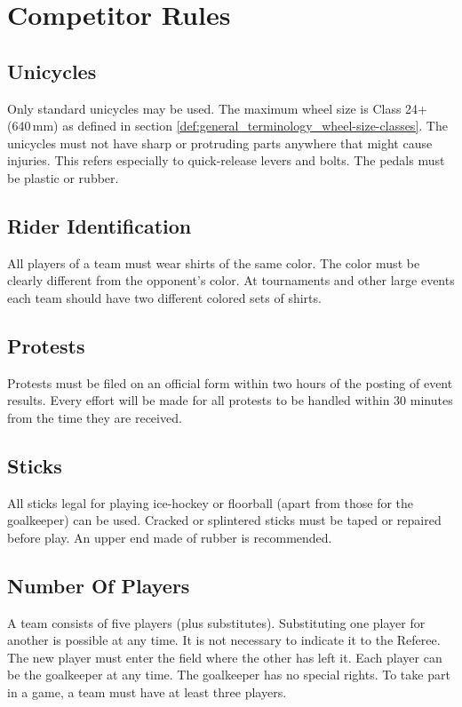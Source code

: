 \chapter{Competitor Rules}

\section{Unicycles}

Only standard unicycles may be used.
The maximum wheel size is Class 24+ (640\,mm) as defined in section \ref{def:general_terminology_wheel-size-classes}.
The unicycles must not have sharp or protruding parts anywhere that might cause injuries.
This refers especially to quick-release levers and bolts.
The pedals must be plastic or rubber.

\section{Rider Identification}

All players of a team must wear shirts of the same color.
The color must be clearly different from the opponent's color.
At tournaments and other large events each team should have two different colored sets of shirts.

\section{Protests}

Protests must be filed on an official form within two hours of the posting of event results.
Every effort will be made for all protests to be handled within 30 minutes from the time they are received.

\section{Sticks}

All sticks legal for playing ice-hockey or floorball (apart from those for the goalkeeper) can be used.
Cracked or splintered sticks must be taped or repaired before play.
An upper end made of rubber is recommended.

\section{Number Of Players}

A team consists of five players (plus substitutes).
Substituting one player for another is possible at any time.
It is not necessary to indicate it to the Referee.
The new player must enter the field where the other has left it.
Each player can be the goalkeeper at any time.
The goalkeeper has no special rights.
To take part in a game, a team must have at least three players.

